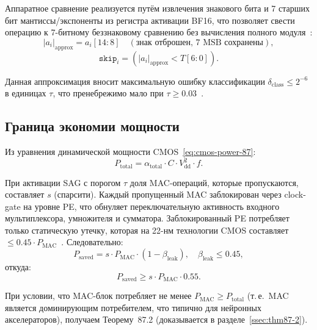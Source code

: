 Аппаратное сравнение реализуется путём извлечения знакового бита
и 7 старших бит мантиссы/экспоненты из регистра активации BF16,
что позволяет свести операцию к 7-битному беззнаковому сравнению
без вычисления полного модуля~\cite{Rabaey-DIC2}:
\begin{equation}
  |a_i|_{\text{approx}} = a_i[14:8] \quad (\text{знак отброшен,
  7 MSB сохранены}),
  \label{eq:approx-mag}
\end{equation}
\begin{equation}
  \texttt{skip}_i = (|a_i|_{\text{approx}} < T[6:0]).
  \label{eq:skip-hw}
\end{equation}

Данная аппроксимация вносит максимальную ошибку классификации
$\delta_{\text{class}} \leq 2^{-6}$ в единицах $\tau$, что
пренебрежимо мало при $\tau \geq 0{.}03$~\cite{muller_fp_handbook}.

\subsection{Граница экономии мощности}
\label{ssec:glava87-power-bound}

Из уравнения динамической мощности CMOS~\eqref{eq:cmos-power-87}:
\begin{equation}
  P_{\mathrm{total}} = \alpha_{\mathrm{total}} \cdot C \cdot
  V_{\mathrm{dd}}^{2} \cdot f.
  \label{eq:power-total}
\end{equation}

При активации SAG с порогом $\tau$ доля MAC-операций, которые
пропускаются, составляет $s$ (спарсити). Каждый пропущенный MAC
заблокирован через clock-gate на уровне PE, что обнуляет
переключательную активность входного мультиплексора, умножителя
и сумматора.  Заблокированный PE потребляет только статическую
утечку, которая на 22-нм технологии CMOS составляет $\leq 0{.}45
\cdot P_{\mathrm{MAC}}$~\cite{IRDS2023-MoreMoore}.  Следовательно:
\begin{equation}
  P_{\mathrm{saved}} = s \cdot P_{\mathrm{MAC}} \cdot
  (1 - \beta_{\mathrm{leak}}),
  \quad \beta_{\mathrm{leak}} \leq 0{.}45,
  \label{eq:power-saved-formula}
\end{equation}
откуда:
\begin{equation}
  P_{\mathrm{saved}} \geq s \cdot P_{\mathrm{MAC}} \cdot 0{.}55.
  \label{eq:power-saved-lb}
\end{equation}

При условии, что MAC-блок потребляет не менее $P_{\mathrm{MAC}} \geq
P_{\mathrm{total}}$ (т.\,е.\ MAC является доминирующим
потребителем, что типично для нейронных акселераторов),
получаем Теорему~87.2 (доказывается в разделе~\ref{ssec:thm87-2}).

